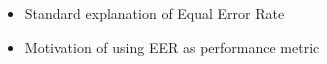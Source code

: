 \begin{itemize}
	\item Standard explanation of Equal Error Rate
	\item Motivation of using EER as performance metric
\end{itemize}